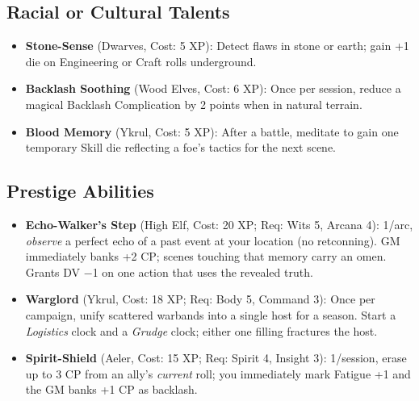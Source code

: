 \subsection{Racial or Cultural Talents}
\begin{itemize}
    \item \textbf{Stone-Sense} (Dwarves, Cost: 5 XP): Detect flaws in stone or earth; gain +1 die on Engineering or Craft rolls underground.
    \item \textbf{Backlash Soothing} (Wood Elves, Cost: 6 XP): Once per session, reduce a magical Backlash Complication by 2 points when in natural terrain.
    \item \textbf{Blood Memory} (Ykrul, Cost: 5 XP): After a battle, meditate to gain one temporary Skill die reflecting a foe's tactics for the next scene.
\end{itemize}

\subsection{Prestige Abilities}
\begin{itemize}
    \item \textbf{Echo-Walker's Step} (High Elf, Cost: 20 XP; Req: Wits 5, Arcana 4): 
1/arc, \emph{observe} a perfect echo of a past event at your location (no retconning). 
GM immediately banks +2 CP; scenes touching that memory carry an omen. Grants DV −1 on one action that uses the revealed truth.
    \item \textbf{Warglord} (Ykrul, Cost: 18 XP; Req: Body 5, Command 3): 
Once per campaign, unify scattered warbands into a single host for a season. Start a \emph{Logistics} clock and a \emph{Grudge} clock; either one filling fractures the host.
    \item \textbf{Spirit-Shield} (Aeler, Cost: 15 XP; Req: Spirit 4, Insight 3): 
1/session, erase up to 3 CP from an ally's \emph{current} roll; you immediately mark Fatigue +1 and the GM banks +1 CP as backlash.
\end{itemize}

